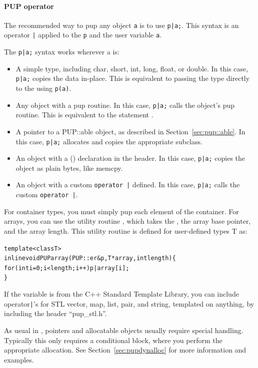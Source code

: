 \paragraph{PUP operator}

\label{sec:pupstl}

The recommended way to pup any object \verb.a. is to use \verb.p|a;..
This syntax is an operator \verb.|. applied to the  \verb.p.
and the user variable \verb.a..

The \verb.p|a;. syntax works wherever a is:

\begin{itemize}
 \item A simple type, including char, short, int, long, float, or double.
    In this case, \verb.p|a;. copies the data in-place.
    This is equivalent to passing the type directly to the    
       using \verb.p(a)..
 \item Any object with a pup routine.
    In this case, \verb.p|a;. calls the object's pup routine.
    This is equivalent to the statement . 
 \item A pointer to a PUP::able object, as described in Section~\ref{sec:pup::able}.
    In this case, \verb.p|a;. allocates and copies the appropriate subclass.
 \item An object with a () declaration in the header.
    In this case, \verb.p|a;. copies the object as plain bytes, like memcpy.
 \item An object with a custom \verb.operator |. defined.
    In this case, \verb.p|a;. calls the custom \verb.operator |..
\end{itemize}

For container types, you must simply pup each element of the container.
For arrays, you can use the utility routine , which takes
the , the array base pointer, and the array length.
This utility routine is defined for user-defined types T as:
  \begin{alltt}
    template<class T>
    inline void PUParray(PUP::er &p,T *array,int length) \{
       for (int i=0;i<length;i++) p|array[i];
    \}
  \end{alltt}

If the variable is from the C++ Standard Template Library, you can include 
operator\verb.|.'s for STL vector, map, list, pair, and string, templated
on anything, by including the header ``pup\_stl.h''.

As usual in \CC{}, pointers and allocatable objects usually require special handling. 
Typically this only requires a  conditional block, 
where you perform the appropriate allocation.  See 
Section~\ref{sec:pupdynalloc} for more information and examples.  

